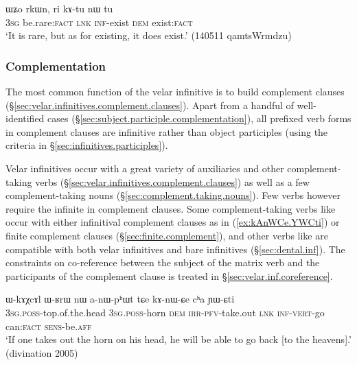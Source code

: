 \begin{exe}
\ex \label{ex:kAtu.nW.tu}
 \gll ɯʑo rkɯn, ri kɤ-tu nɯ tu  \\
 \textsc{3sg} be.rare:\textsc{fact} \textsc{lnk} \textsc{inf}-exist \textsc{dem} exist:\textsc{fact} \\
 \glt `It is rare, but as for existing, it does exist.' (140511 qamtsWrmdzu)
\end{exe}

\subsubsection{Complementation}    \label{sec:inf.complementation}
The most common function of the velar infinitive is to build complement clauses (§\ref{sec:velar.infinitives.complement.clauses}). Apart from a handful of well-identified cases (§\ref{sec:subject.participle.complementation}), all  prefixed verb forms in complement clauses are infinitive rather than object participles (using the criteria in §\ref{sec:infinitives.participles}). 

Velar infinitives occur with a great variety of auxiliaries and other com\-ple\-ment-taking verbs (§\ref{sec:velar.infinitives.complement.clauses}) as well as a few com\-ple\-ment-taking nouns (§\ref{sec:complement.taking.nouns}). Few verbs however require the infinite in complement clauses. Some com\-ple\-ment-taking verbs like  occur with either infinitival complement clauses as in (\ref{ex:kAnWCe.YWCti}) or finite complement clauses (§\ref{sec:finite.complement}), and other verbs like  are compatible with both velar infinitives and bare infinitives (§\ref{sec:dental.inf}). The constraints on co-reference between the subject of the matrix verb and the participants of the complement clause is treated in §\ref{sec:velar.inf.coreference}.

\begin{exe}
\ex \label{ex:kAnWCe.YWCti}
 \gll  ɯ-kɤχcɤl ɯ-ʁrɯ nɯ a-nɯ-pʰɯt tɕe kɤ-nɯ-ɕe cʰa ɲɯ-ɕti \\
 \textsc{3sg}.\textsc{poss}-top.of.the.head \textsc{3sg}.\textsc{poss}-horn \textsc{dem} \textsc{irr}-\textsc{pfv}-take.out \textsc{lnk} \textsc{inf}-\textsc{vert}-go can:\textsc{fact} \textsc{sens}-be.\textsc{aff} \\
\glt `If one takes out the horn on his head, he will be able to go back [to the heavens].' (divination 2005)
\end{exe}
 
